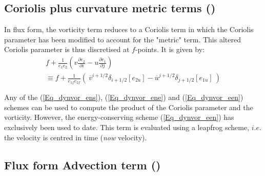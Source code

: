 \documentclass[NEMO_book]{subfiles}
\begin{document}
\subsection   [Coriolis plus curvature metric terms (\textit{dynvor}) ]
			{Coriolis plus curvature metric terms () }
\label{DYN_cor_flux}

In flux form, the vorticity term reduces to a Coriolis term in which the Coriolis 
parameter has been modified to account for the "metric" term. This altered 
Coriolis parameter is thus discretised at $f$-points. It is given by: 
\begin{multline} \label{Eq_dyncor_metric}
f+\frac{1}{e_1 e_2 }\left( {v\frac{\partial e_2 }{\partial i}  -  u\frac{\partial e_1 }{\partial j}} \right)  \\
   \equiv   f + \frac{1}{e_{1f} e_{2f} } \left( { \ \overline v ^{i+1/2}\delta _{i+1/2} \left[ {e_{2u} } \right]  
                                                                 -  \overline u ^{j+1/2}\delta _{j+1/2} \left[ {e_{1u} } \right]  }  \ \right)
\end{multline} 

Any of the (\ref{Eq_dynvor_ens}), (\ref{Eq_dynvor_ene}) and (\ref{Eq_dynvor_een}) 
schemes can be used to compute the product of the Coriolis parameter and the 
vorticity. However, the energy-conserving scheme  (\ref{Eq_dynvor_een}) has 
exclusively been used to date. This term is evaluated using a leapfrog scheme, 
$i.e.$ the velocity is centred in time (\textit{now} velocity).

\subsection   [Flux form Advection term (\textit{dynadv}) ]
			{Flux form Advection term () }
\label{DYN_adv_flux}
\end{document}

